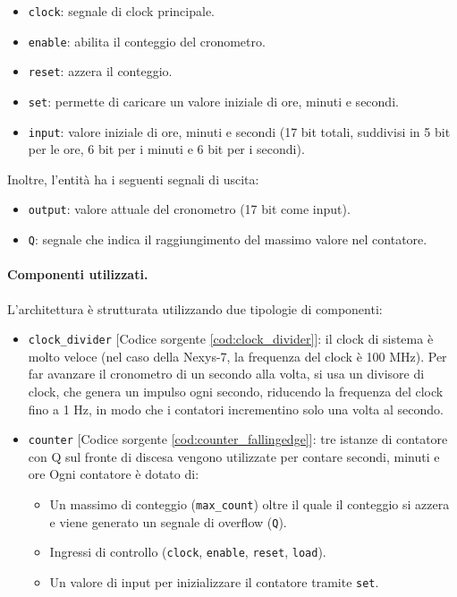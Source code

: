 \begin{itemize}
    \item \texttt{clock}: segnale di clock principale.
    \item \texttt{enable}: abilita il conteggio del cronometro.
    \item \texttt{reset}: azzera il conteggio.
    \item \texttt{set}: permette di caricare un valore iniziale di ore, minuti e secondi.
    \item \texttt{input}: valore iniziale di ore, minuti e secondi (17 bit totali, suddivisi in 5 bit per le ore, 6 bit per i minuti e 6 bit per i secondi).
\end{itemize}

Inoltre, l'entità ha i seguenti segnali di uscita:

\begin{itemize}
    \item \texttt{output}: valore attuale del cronometro (17 bit come input).
    \item \texttt{Q}: segnale che indica il raggiungimento del massimo valore nel contatore.
\end{itemize}

\paragraph{Componenti utilizzati.}
L'architettura è strutturata utilizzando due tipologie di componenti:

\begin{itemize}
    \item \texttt{clock\_divider} [Codice sorgente \ref{cod:clock_divider}]: il clock di sistema è molto veloce (nel caso della Nexys-7, la frequenza del clock è 100 MHz). Per far avanzare il cronometro di un secondo alla volta, si usa un divisore di clock, che genera un impulso ogni secondo, riducendo la frequenza del clock fino a 1 Hz, in modo che i contatori incrementino solo una volta al secondo.
    \item \texttt{counter} [Codice sorgente \ref{cod:counter_fallingedge}]: tre istanze di contatore con Q sul fronte di discesa vengono utilizzate per contare secondi, minuti e ore  Ogni contatore è dotato di:
    \begin{itemize}
        \item Un massimo di conteggio (\texttt{max\_count}) oltre il quale il conteggio si azzera e viene generato un segnale di overflow (\texttt{Q}).
        \item Ingressi di controllo (\texttt{clock}, \texttt{enable}, \texttt{reset}, \texttt{load}).
        \item Un valore di input per inizializzare il contatore tramite \texttt{set}.
    \end{itemize}
\end{itemize}

